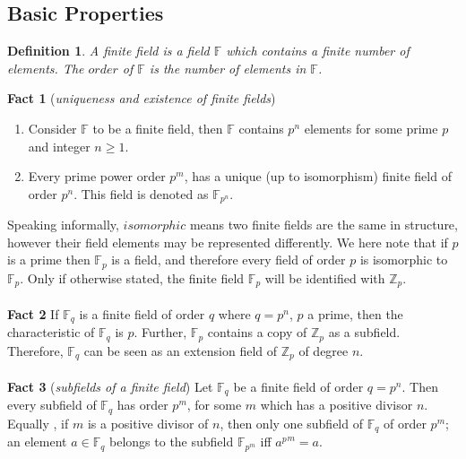 \documentclass[iwp,first]{luthesis}
\begin{document}
\subsection{Basic Properties}

\newtheorem{name}{Printed output}
\newtheorem{mydef}{Definition}
\begin{mydef}
A \textit{finite field} is a field $\mathbb{F}$ which contains a finite number of elements. The $order$ of $\mathbb{F}$ is the number of elements in $\mathbb{F}$.
\end{mydef}

\textbf{Fact 1} (\textit{uniqueness and existence of finite fields})
\begin{enumerate}

\item Consider $\mathbb{F}$ to be a finite field, then $\mathbb{F}$ contains $p^n$ elements for some prime $p$ and integer $n \geq 1$.

\item Every prime power order $p^m$, has a unique (up to isomorphism) finite field of order $p^n$. This field is denoted as $\mathbb{F}_{p^n}$.

\end{enumerate}

Speaking informally, $isomorphic$ means two finite fields are the same in structure, however their field elements may be represented differently. We here note that if $p$ is a prime then $\mathbb{F}_{p}$ is a field, and therefore every field of order $p$ is isomorphic to $\mathbb{F}_p$. Only if otherwise stated, the finite field $\mathbb{F}_p$ will be identified with $\mathbb{Z}_p$.
\\
\\
\textbf{Fact 2} If $\mathbb{F}_q$ is a finite field of order $q$ where $q = p^n$, $p$ a prime, then the characteristic of $\mathbb{F}_{q}$ is $p$. Further, $\mathbb{F}_p$ contains a copy of $\mathbb{Z}_p$ as a subfield. Therefore, $\mathbb{F}_q$ can be seen as an extension field of $\mathbb{Z}_p$ of degree $n$. 
\\
\\
\textbf{Fact 3} (\textit{subfields of a finite field}) Let $\mathbb{F}_q$ be a finite field of order $q = p^n$. Then every subfield of $\mathbb{F}_q$  has order $p^m$, for some $m$ which has a positive divisor $n$. Equally , if $m$ is a positive divisor of $n$, then only one subfield of $\mathbb{F}_q$ of order $p^m$; an element $a\in \mathbb{F}_q$ belongs to the subfield $\mathbb{F}_{p^m}$ iff ${a^p}^{m} = a$.
\end{document}
